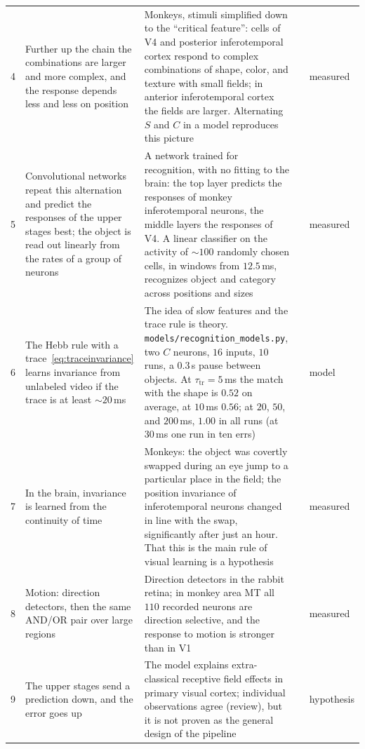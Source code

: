 {\begin{longtable}{>{\raggedright}p{0.5cm}>{\raggedright}p{4.0cm}>{\raggedright}p{5.6cm}>{\raggedright}p{2.3cm}>{\raggedright\arraybackslash}p{1.7cm}}
4 & Further up the chain the combinations are larger and more complex, and the response depends less and less on position & Monkeys, stimuli simplified down to the ``critical feature'': cells of V4 and posterior inferotemporal cortex respond to complex combinations of shape, color, and texture with small fields; in anterior inferotemporal cortex the fields are larger. Alternating $S$ and $C$ in a model reproduces this picture & \cite{KobatakeTanaka1994,Riesenhuber1999} & measured \\
5 & Convolutional networks repeat this alternation and predict the responses of the upper stages best; the object is read out linearly from the rates of a group of neurons & A network trained for recognition, with no fitting to the brain: the top layer predicts the responses of monkey inferotemporal neurons, the middle layers the responses of V4. A linear classifier on the activity of $\sim100$ randomly chosen cells, in windows from $12.5$\,ms, recognizes object and category across positions and sizes & \cite{Fukushima1980,Yamins2014,Hung2005} & measured \\
6 & The Hebb rule with a trace~\eqref{eq:traceinvariance} learns invariance from unlabeled video if the trace is at least $\sim20$\,ms & The idea of slow features and the trace rule is theory. \texttt{models/\allowbreak recognition\_models.py}, two $C$ neurons, $16$ inputs, $10$ runs, a $0.3$\,s pause between objects. At $\tau_{\text{tr}}=5$\,ms the match with the shape is $0.52$ on average, at $10$\,ms $0.56$; at $20$, $50$, and $200$\,ms, $1.00$ in all runs (at $30$\,ms one run in ten errs) & \cite{Foldiak1991,WiskottSejnowski2002} & model \\
7 & In the brain, invariance is learned from the continuity of time & Monkeys: the object was covertly swapped during an eye jump to a particular place in the field; the position invariance of inferotemporal neurons changed in line with the swap, significantly after just an hour. That this is the main rule of visual learning is a hypothesis & \cite{LiDiCarlo2008} & measured \\
8 & Motion: direction detectors, then the same AND/OR pair over large regions & Direction detectors in the rabbit retina; in monkey area MT all $110$ recorded neurons are direction selective, and the response to motion is stronger than in V1 & \cite{Barlow1965,Albright1984} & measured \\
9 & The upper stages send a prediction down, and the error goes up & The model explains extra-classical receptive field effects in primary visual cortex; individual observations agree (review), but it is not proven as the general design of the pipeline & \cite{RaoBallard1999,Keller2018} & hypothesis \\

\end{longtable}}
